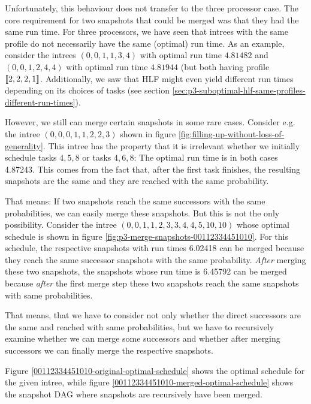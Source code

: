 Unfortunately, this behaviour does not transfer to the three processor case. The core requirement for two snapshots that could be merged was that they had the same run time. For three processors, we have seen that intrees with the same profile do not necessarily have the same (optimal) run time. As an example, consider the intrees $(0,0,1,1,3,4)$ with optimal run time $4.81482$ and $(0,0,1,2,4,4)$ with optimal run time $4.81944$ (but both having profile $\left\llbracket 2,2,2,1 \right\rrbracket$. Additionally, we saw that HLF might even yield different run times depending on its choices of tasks (see section \ref{sec:p3-suboptimal-hlf-same-profiles-different-run-times}).

However, we still can merge certain snapshots in some rare cases. Consider e.g. the intree $(0,0,0,1,1,2,2,3)$ shown in figure \ref{fig:filling-up-without-loss-of-generality}. This intree has the property that it is irrelevant whether we initially schedule tasks $4,5,8$ or tasks $4,6,8$: The optimal run time is in both cases 4.87243. This comes from the fact that, after the first task finishes, the resulting snapshots are the same and they are reached with the same probability.

That means: If two snapshots reach the same successors with the same probabilities, we can easily merge these snapshots. But this is not the only possibility. Consider the intree $(0,0,1,1,2,3,3,4,4,5,10,10)$ whose optimal schedule is shown in figure \ref{fig:p3-merge-snapshots-00112334451010}. For this schedule, the respective snapshots with run times 6.02418 can be merged because they reach the same successor snapshots with the same probability. \emph{After} merging these two snapshots, the snapshots whose run time is 6.45792 can be merged because \emph{after} the first merge step these two snapshots reach the same snapshots with same probabilities. 

That means, that we have to consider not only whether the direct successors are the same and reached with same probabilities, but we have to recursively examine whether we can merge some successors and whether after merging successors we can finally merge the respective snapshots.

Figure \ref{00112334451010-original-optimal-schedule} shows the optimal schedule for the given intree, while figure \ref{00112334451010-merged-optimal-schedule} shows the snapshot DAG where snapshots are recursively have been merged.

